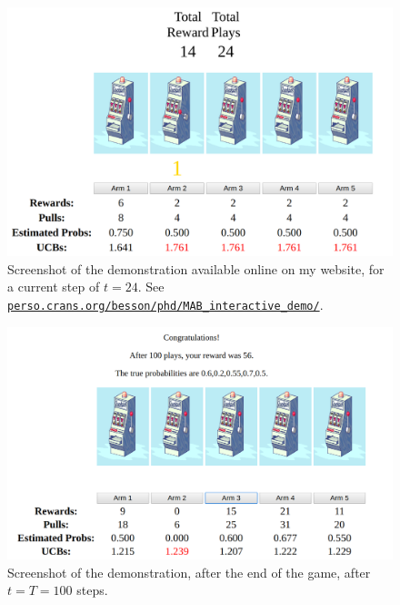 \begin{figure}[h!]  %
    \centering
    \includegraphics[width=0.95\linewidth]{2-Chapters/2-Chapter/Images/example_of_a_5_arm_bandit_problem.png}
    \caption{Screenshot of the demonstration available online on my website, for a current step of $t=24$. See \href{https://perso.crans.org/besson/phd/MAB\_interactive\_demo/}{\texttt{perso.crans.org/besson/phd/MAB\_interactive\_demo/}}.}
    \label{fig:2:example_of_a_5_arm_bandit_problem}
\end{figure}

\begin{figure}[h!]  %
    \centering
    \includegraphics[width=0.95\linewidth]{2-Chapters/2-Chapter/Images/example_of_a_5_arm_bandit_problem__step100.png}
    \caption{Screenshot of the demonstration, after the end of the game, after $t=T=100$ steps.}
    \label{fig:2:example_of_a_5_arm_bandit_problem__step100}
\end{figure}


